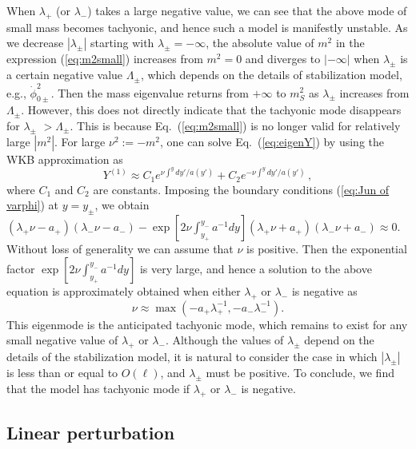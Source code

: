 \documentclass[a4paper,showpacs,preprintnumbers,amsmath,amssymb]{revtex4}
\begin{document}
 
When $\lambda_+$ (or $\lambda_-$) takes a large negative value, we can see that the above mode of small mass becomes tachyonic, and hence such a model is manifestly unstable. 
As we decrease $|\lambda_\pm|$ starting with $ \lambda_\pm =-\infty$, the absolute value of $m^2$ in the expression (\ref{eq:m2small}) increases from $m^2=0$ and diverges to $|-\infty|$ when $\lambda_\pm$ is a certain negative value $\Lambda_\pm$, which depends on the details of stabilization model, e.g., $\dot \phi_{0\pm}^2$. 
Then the mass eigenvalue returns from $+\infty$ to $m_S^2$ as 
$\lambda_\pm$ increases from $\Lambda_\pm$. 
However, this does not directly indicate that the tachyonic mode disappears for $\lambda_\pm$ $> \Lambda_\pm$.
This is because Eq.~(\ref{eq:m2small}) is no longer valid for relatively large $|m^2|$. 
For large $\nu^2:=-m^2$, one can solve Eq.~(\ref{eq:eigenY}) by using the WKB approximation as 
\begin{equation}
 Y^{(1)}\approx C_1 e^{\nu \int^y dy'/a(y')} +
          C_2 e^{-\nu \int^y dy'/a(y')}\,, 
\end{equation}
where $C_1$ and $C_2$ are constants. 
Imposing the boundary conditions (\ref{eq:Jun of varphi}) at $y=y_\pm$, we obtain 
$(\lambda_+\nu-a_+)(\lambda_-\nu - a_-) 
 -\exp[2\nu \int_{y_+}^{y_-}a^{-1} dy]  
  (\lambda_+\nu + a_+) (\lambda_- \nu + a_-) \approx 0$. 
Without loss of generality we can assume that $\nu$ is positive. 
Then the exponential factor $\exp[2\nu \int_{y_+}^{y_-}a^{-1} dy ]$ is very large, and hence a solution to the above equation is approximately obtained when either $\lambda_+$ or $\lambda_-$ is negative as 
\begin{equation}
\nu \approx \max (- a_+\lambda_+^{-1}, - a_- \lambda_-^{-1}). 
\end{equation}
This eigenmode is the anticipated tachyonic mode, which remains to exist for any small negative value of $\lambda_+$ or $\lambda_-$. 
Although the values of $\lambda_\pm$ depend on the details of the stabilization model, it is natural to consider the case in which  $|\lambda_\pm|$ is less than or equal to $O(\ell)$, and $\lambda_\pm$ must be positive.  To conclude, we find that the model has tachyonic mode if $\lambda_+$ or $\lambda_-$ is negative.



\subsection{Linear perturbation}
 
\end{document}

